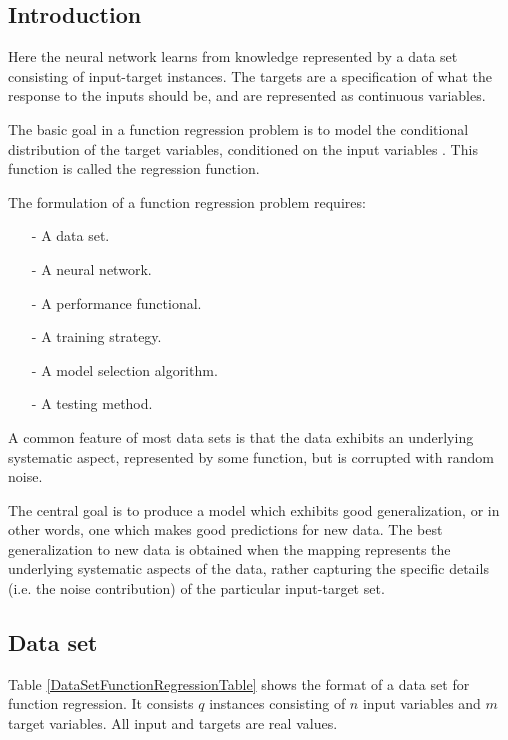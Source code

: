 
\subsection*{Introduction}

Here the neural network learns from knowledge represented by a data set consisting of input-target instances. The targets
are a specification of what the response to the inputs should be, and are represented as continuous variables. 

The basic goal in a function regression problem is to model the
conditional distribution of the target variables, conditioned on
the input variables \cite{Bishop1995}. This function is called the
regression function.

The formulation of a function regression problem requires:

\begin{itemize}
\item[-] A data set. 
\item[-] A neural network.
\item[-] A performance functional.
\item[-] A training strategy.
\item[-] A model selection algorithm.
\item[-] A testing method.
\end{itemize}

A common feature of most data sets is that the data
exhibits an underlying systematic aspect, represented by some
function, but is corrupted with random noise. 

The central goal is to produce a model which exhibits good generalization, or in other words, one which makes good predictions for new data. The best generalization to new data is obtained when the mapping represents the underlying
systematic aspects of the data, rather capturing the specific
details (i.e. the noise contribution) of the particular input-target
set. 

\subsection*{Data set}


Table \ref{DataSetFunctionRegressionTable} shows the format of a data set for function regression. 
It consists $q$ instances consisting of $n$ input variables and $m$ target variables. 
All input and targets are real values. 

